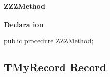 \documentclass{report}
\newif\ifpdf
\begin{document}
\paragraph*{ZZZMethod}\hspace*{\fill}

\label{ok_sorting.TMyClass-ZZZMethod}
\begin{list}{}{
\setlength{\itemindent}{0cm}
\setlength{\listparindent}{0cm}
\setlength{\leftmargin}{\evensidemargin}
\addtolength{\leftmargin}{\tmplength}
\settowidth{\labelsep}{X}
\addtolength{\leftmargin}{\labelsep}
\setlength{\labelwidth}{\tmplength}
}
\item[\textbf{Declaration}\hfill]
\ifpdf
\begin{flushleft}
\fi
\begin{ttfamily}
public procedure ZZZMethod;\end{ttfamily}

\ifpdf
\end{flushleft}
\fi

\end{list}
\ifpdf
\subsection*{\large{\textbf{TMyRecord Record}}\normalsize\hspace{1ex}\hrulefill}
\else
\subsection*{TMyRecord Record}
\fi
\label{ok_sorting.TMyRecord}
\end{document}
